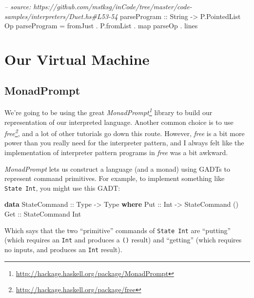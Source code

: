 \documentclass[]{article}
\newenvironment{Shaded}{}{}
\newcommand{\KeywordTok}[1]{\textcolor[rgb]{0.00,0.44,0.13}{\textbf{#1}}}
\newcommand{\DataTypeTok}[1]{\textcolor[rgb]{0.56,0.13,0.00}{#1}}
\newcommand{\CommentTok}[1]{\textcolor[rgb]{0.38,0.63,0.69}{\textit{#1}}}
\newcommand{\OtherTok}[1]{\textcolor[rgb]{0.00,0.44,0.13}{#1}}
\newcommand{\FunctionTok}[1]{\textcolor[rgb]{0.02,0.16,0.49}{#1}}
\newcommand{\NormalTok}[1]{#1}
\renewcommand{\href}[2]{#2\footnote{\url{#1}}}
\begin{document}
\begin{Shaded}
\begin{Highlighting}[]
\CommentTok{-- source: https://github.com/mstksg/inCode/tree/master/code-samples/interpreters/Duet.hs#L53-54}
\OtherTok{parseProgram ::} \DataTypeTok{String} \OtherTok{->} \DataTypeTok{P.PointedList} \DataTypeTok{Op}
\NormalTok{parseProgram }\FunctionTok{=}\NormalTok{ fromJust }\FunctionTok{.}\NormalTok{ P.fromList }\FunctionTok{.}\NormalTok{ map parseOp }\FunctionTok{.}\NormalTok{ lines}
\end{Highlighting}
\end{Shaded}

\section{Our Virtual Machine}\label{our-virtual-machine}

\subsection{MonadPrompt}\label{monadprompt}

We're going to be using the great
\emph{\href{http://hackage.haskell.org/package/MonadPrompt}{MonadPrompt}}
library to build our representation of our interpreted language. Another common
choice is to use \emph{\href{http://hackage.haskell.org/package/free}{free}},
and a lot of other tutorials go down this route. However, \emph{free} is a bit
more power than you really need for the interpreter pattern, and I always felt
like the implementation of interpreter pattern programs in \emph{free} was a bit
awkward.

\emph{MonadPrompt} lets us construct a language (and a monad) using GADTs to
represent command primitives. For example, to implement something like
\texttt{State\ Int}, you might use this GADT:

\begin{Shaded}
\begin{Highlighting}[]
\KeywordTok{data} \DataTypeTok{StateCommand}\OtherTok{ ::} \DataTypeTok{Type} \OtherTok{->} \DataTypeTok{Type} \KeywordTok{where}
    \DataTypeTok{Put}\OtherTok{ ::} \DataTypeTok{Int} \OtherTok{->} \DataTypeTok{StateCommand}\NormalTok{ ()}
    \DataTypeTok{Get}\OtherTok{ ::} \DataTypeTok{StateCommand} \DataTypeTok{Int}
\end{Highlighting}
\end{Shaded}

Which says that the two ``primitive'' commands of \texttt{State\ Int} are
``putting'' (which requires an \texttt{Int} and produces a \texttt{()} result)
and ``getting'' (which requires no inputs, and produces an \texttt{Int} result).
\end{document}
